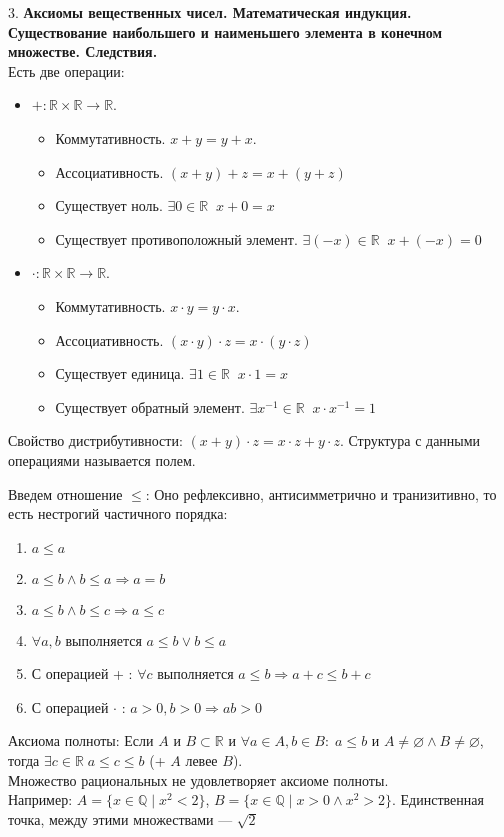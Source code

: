 \documentclass[12pt]{article}
\begin{document}
3. \textbf{Аксиомы вещественных чисел. Математическая индукция. Существование наибольшего и наименьшего элемента в конечном множестве. Следствия.}\\
Есть две операции:
\begin{itemize}
    \item $+: \mathbb{R} \times \mathbb{R} \to \mathbb{R}$.
        \begin{itemize}
            \item Коммутативность. $x+y=y+x$.
            \item Ассоциативность.  $(x+y)+z=x+(y+z)$
            \item Существует ноль.  $\exists 0 \in \mathbb{R} \; \; x + 0 = x$
            \item Существует противоположный элемент. $\exists (-x) \in \mathbb{R} \; \; x+(-x) = 0$
        \end{itemize}
    \item $\cdot: \mathbb{R} \times \mathbb{R} \to \mathbb{R}$.
        \begin{itemize}
            \item Коммутативность. $x\cdot y=y\cdot x$.
            \item Ассоциативность.  $(x\cdot y)\cdot z=x\cdot (y\cdot z)$
            \item Существует единица.  $\exists 1 \in \mathbb{R} \; \; x \cdot 1 = x$
            \item Существует обратный элемент. $\exists x^{-1} \in \mathbb{R} \; \; x \cdot x^{-1} = 1$
        \end{itemize}
\end{itemize}
Свойство дистрибутивности: $(x+y) \cdot z = x \cdot z + y \cdot z$. Структура с данными операциями называется полем.

Введем отношение $\le$: Оно рефлексивно, антисимметрично и транизитивно, то есть нестрогий частичного порядка:
\begin{enumerate}
    \item $a \le a$
    \item $a \le b \wedge b \le a \Rightarrow a = b$
    \item $a \le b \wedge b \le c \Rightarrow a \le c$
    \item $\forall a, b$ выполняется $a \le b \vee b \le a$
    \item С операцией + : $\forall c$ выполняется $a \le b \Rightarrow a + c \le b + c$
    \item С операцией $\cdot$ : $a > 0, b > 0 \Rightarrow ab > 0$
\end{enumerate}
Аксиома полноты: Если $A$ и $B \subset \mathbb{R}$ и $\forall a \in A, b \in B: \; a \le b$ и $A \neq \varnothing \land B \neq \varnothing$, тогда $\exists c \in \mathbb{R}\; a \le c \le b$ (+ $A$ левее $B$).\\
Множество рациональных не удовлетворяет аксиоме полноты.\\
Например: $A = \{x \in \mathbb{Q} \; \vert \; x^2 < 2\}$,  $B = \{x \in \mathbb{Q} \; \vert \; x>0 \land x^2 > 2\}$. Единственная точка, между этими множествами --- $\sqrt{2}$ 
\end{document}

